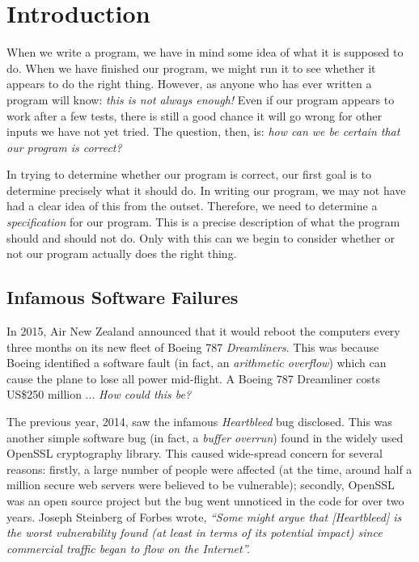 \chapter{Introduction}
When we write a program, we have in mind some idea of what it is supposed to do.  When we have finished our program, we might run it to see whether it appears to do the right thing.  However, as anyone who has ever written a program will know: {\em this is not always enough!}  Even if our program appears to work after a few tests, there is still a good chance it will go wrong for other inputs we have not yet tried.  The question, then, is: {\em how can we be certain that our program is correct?}

In trying to determine whether our program is correct, our first goal is to determine precisely what it should do.  In writing our program, we may not have had a clear idea of this from the outset.  Therefore, we need to determine a {\em specification} for our program.  This is a precise description of what the program should and should not do.  Only with this can we begin to consider whether or not our program actually does the right thing.


\section{Infamous Software Failures}

In 2015, Air New Zealand announced that it would reboot the computers every three months on its new fleet of Boeing 787 {\em Dreamliners}.  This was because Boeing identified a software fault (in fact, an {\em arithmetic overflow}) which can cause the plane to lose all power mid-flight.  A Boeing 787 Dreamliner costs US\$250 million ... {\em How could this be?}  

The previous year, 2014, saw the infamous {\em Heartbleed} bug disclosed.  This was another simple software bug (in fact, a {\em buffer overrun}) found in the widely used OpenSSL cryptography library.   This caused wide-spread concern for several reasons:  firstly, a large number of people were affected (at the time, around half a million secure web servers were believed to be vulnerable); secondly, OpenSSL was an open source project but the bug went unnoticed in the code for over two years. Joseph Steinberg of Forbes wrote, {\em ``Some might argue that [Heartbleed] is the worst vulnerability found (at least in terms of its potential impact) since commercial traffic began to flow on the Internet''.}

